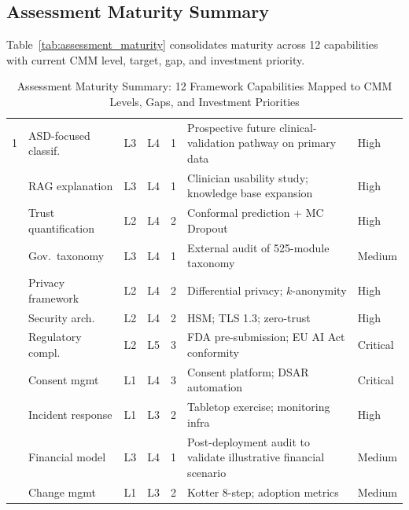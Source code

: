 \subsection{Assessment Maturity Summary}

Table~\ref{tab:assessment_maturity} consolidates maturity across 12 capabilities with current CMM level, target, gap, and investment priority.

\begin{table}[!htbp]
\tablestripes\tablefontsize
\tablefontsize
\caption[Assessment Maturity Summary]{Assessment Maturity Summary: 12 Framework Capabilities Mapped to CMM Levels, Gaps, and Investment Priorities}
\begin{tabularx}{\textwidth}{@{} p{0.3cm} >{\raggedright\arraybackslash}p{1.6cm} C C C L >{\raggedright\arraybackslash}p{0.8cm} @{}}
\toprule
\thead{\#} &  &  &  &  &  &  \\
 & ASD-focused classif. & L3 & L4 & 1 & Prospective future clinical-validation pathway on primary data & High \\
 & RAG explanation & L3 & L4 & 1 & Clinician usability study; knowledge base expansion & High \\
 & Trust quantification & L2 & L4 & 2 & Conformal prediction + MC Dropout & High \\
 & Gov.\ taxonomy & L3 & L4 & 1 & External audit of 525-module taxonomy & Medium \\
 & Privacy framework & L2 & L4 & 2 & Differential privacy; $k$-anonymity & High \\
 & Security arch. & L2 & L4 & 2 & HSM; TLS 1.3; zero-trust & High \\
 & Regulatory compl. & L2 & L5 & 3 & FDA pre-submission; EU AI Act conformity & Critical \\
 & Consent mgmt & L1 & L4 & 3 & Consent platform; DSAR automation & Critical \\
 & Incident response & L1 & L3 & 2 & Tabletop exercise; monitoring infra & High \\
 & Financial model & L3 & L4 & 1 & Post-deployment audit to validate illustrative financial scenario & Medium \\
 & Change mgmt & L1 & L3 & 2 & Kotter 8-step; adoption metrics & Medium \\

\end{tabularx}
\end{table}
